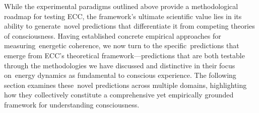 While the experimental paradigms outlined above provide a methodological roadmap for testing ECC, the framework's ultimate scientific value lies in its ability to generate~novel predictions that differentiate it from competing theories of consciousness. Having established concrete empirical approaches for measuring~energetic coherence, we now turn to the specific~predictions that emerge from ECC's theoretical framework—predictions that are both testable through the methodologies we have discussed and distinctive in their focus on~energy dynamics as fundamental to conscious experience. The following section examines these~novel predictions across multiple domains, highlighting how they collectively constitute a comprehensive yet empirically grounded framework for understanding consciousness.
